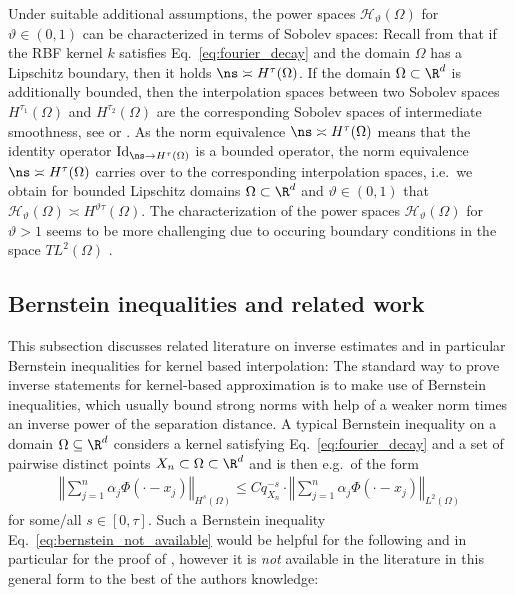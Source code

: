 \documentclass[a4paper, 10pt]{article}
\newcommand{\Ht}{\mathcal{H}_{\vartheta}}
\begin{document}
%
%
Under suitable additional assumptions, the power spaces $\Ht(\Omega)$ for $\vartheta \in (0, 1)$ can be characterized in terms of Sobolev spaces:
Recall from  that if the RBF kernel $k$ satisfies Eq.\ \eqref{eq:fourier_decay} and the domain $\Omega$ has a Lipschitz boundary, then it holds $\ns \asymp H^\tau(\Omega)$.
If the domain $\Omega \subset \R^d$ is additionally bounded, then the interpolation spaces between two Sobolev spaces $H^{\tau_1}(\Omega)$ and $H^{\tau_2}(\Omega)$ are the corresponding Sobolev spaces of intermediate smoothness, see \cite[Theorem 13.2.2]{agranovich2015sobolev} or \cite[Theorem 14.2.7]{brenner2008mathematical}.
As the norm equivalence $\ns \asymp H^\tau(\Omega)$ means that the identity operator $\mathrm{Id}_{\ns \rightarrow H^\tau(\Omega)}$ is a bounded operator, 
the norm equivalence $\ns \asymp H^\tau(\Omega)$ carries over to the corresponding interpolation spaces, i.e.\ we obtain for bounded Lipschitz domains $\Omega \subset \R^d$ and $\vartheta \in (0, 1)$ that $\Ht(\Omega) \asymp H^{\vartheta \tau}(\Omega)$.
The characterization of the power spaces $\Ht(\Omega)$ for $\vartheta > 1$ seems to be more challenging due to occuring boundary conditions in the space $TL^2(\Omega)$ \cite{schaback2018superconvergence}.
%


\subsection{Bernstein inequalities and related work} \label{subsec:related_work}

This subsection discusses related literature on inverse estimates and in particular Bernstein inequalities for kernel based interpolation:
The standard way to prove inverse statements for kernel-based approximation is to make use of Bernstein inequalities, 
which usually bound strong norms with help of a weaker norm times an inverse power of the separation distance.
A typical Bernstein inequality on a domain $\Omega \subseteq \R^d$ considers a kernel satisfying Eq.~\eqref{eq:fourier_decay} and a set of pairwise distinct points $X_n \subset \Omega \subset \R^d$ and is then e.g.\ of the form
\begin{align}
\label{eq:bernstein_not_available}
\left \Vert \sum_{j=1}^n \alpha_j \Phi(\cdot - x_j) \right \Vert_{H^s(\Omega)} \leq C q_{X_n}^{-s} \cdot \left \Vert \sum_{j=1}^n \alpha_j  \Phi(\cdot - x_j) \right \Vert_{L^2(\Omega)}
\end{align}
for some/all $s \in [0, \tau]$.
Such a Bernstein inequality Eq.~\eqref{eq:bernstein_not_available} would be helpful for the following and in particular for the proof of ,
however it is \textit{not} available in the literature in this general form to the best of the authors knowledge:
\end{document}
